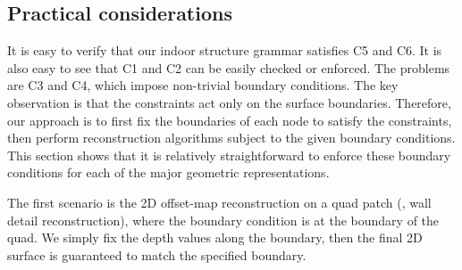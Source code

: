 %  
%
%
%
%
%


\subsection{Practical considerations}
It is easy to verify that our indoor structure grammar satisfies C5 and
C6. It is also easy to see that C1 and C2 can be easily checked or enforced.
The problems are C3 and C4,
which impose non-trivial boundary conditions.  The key observation is
that the constraints act only on the surface boundaries. Therefore, our
approach is to first fix the boundaries of each node to satisfy the
constraints, then perform reconstruction algorithms subject to the given
boundary conditions. This section shows that it is relatively
straightforward to enforce these boundary conditions for each of the
major geometric representations.

The first scenario is the 2D offset-map reconstruction on a quad patch
(\eg, wall detail reconstruction), where the boundary condition is at
the boundary of the quad. We simply fix the depth values along the
boundary, then the final 2D surface is guaranteed to match the specified
boundary.

